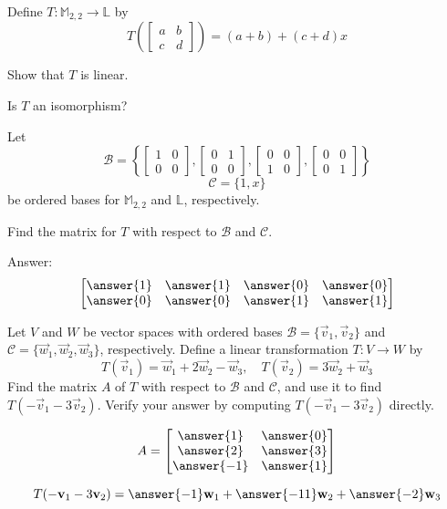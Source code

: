\documentclass{ximera}
\begin{document}
\begin{problem}
Define $T:\mathbb{M}_{2,2}\rightarrow \mathbb{L}$ by 
$$T\left(\begin{bmatrix}a&b\\c&d\end{bmatrix}\right)=(a+b)+(c+d)x$$

\begin{problem}\label{prob:m22tolpart1}
Show that $T$ is linear.
\end{problem}

\begin{problem}\label{prob:m22tolpart2}
Is $T$ an isomorphism? 
\end{problem}


\begin{problem}\label{prob:m22tolpart3}
Let
$$\mathcal{B}=\left\{\begin{bmatrix}1&0\\0&0\end{bmatrix}, \begin{bmatrix}0&1\\0&0\end{bmatrix}, \begin{bmatrix}0&0\\1&0\end{bmatrix}, \begin{bmatrix}0&0\\0&1\end{bmatrix}\right\}$$
$$\mathcal{C}=\{1, x\}$$
be ordered bases for $\mathbb{M}_{2,2}$ and $\mathbb{L}$, respectively.

Find the matrix for $T$ with respect to $\mathcal{B}$ and $\mathcal{C}$.

Answer:
$$\begin{bmatrix}\answer{1}&\answer{1}&\answer{0}&\answer{0}\\\answer{0}&\answer{0}&\answer{1}&\answer{1}\end{bmatrix}$$

\end{problem}
\end{problem}

\begin{problem}\label{prob:matlintransabstract1}
Let $V$ and $W$ be vector spaces with ordered bases $\mathcal{B}=\{\vec{v}_1, \vec{v}_2\}$ and $\mathcal{C}=\{\vec{w}_1, \vec{w}_2, \vec{w}_3\}$, respectively.  Define a linear transformation $T:V\rightarrow W$ by $$T(\vec{v}_1)=\vec{w}_1+2\vec{w}_2-\vec{w}_3,\quad T(\vec{v}_2)=3\vec{w}_2+\vec{w}_3$$
Find the matrix $A$ of $T$ with respect to $\mathcal{B}$ and $\mathcal{C}$, and use it to find $T(-\vec{v}_1-3\vec{v}_2)$.  Verify your answer by computing $T(-\vec{v}_1-3\vec{v}_2)$ directly.

$$A=\begin{bmatrix}\answer{1}&\answer{0}\\\answer{2}&\answer{3}\\\answer{-1}&\answer{1}\end{bmatrix}$$

$$T(-\vec{v}_1-3\vec{v}_2)=\answer{-1}\vec{w}_1+\answer{-11}\vec{w}_2+\answer{-2}\vec{w}_3$$
\end{problem}
\end{document}
